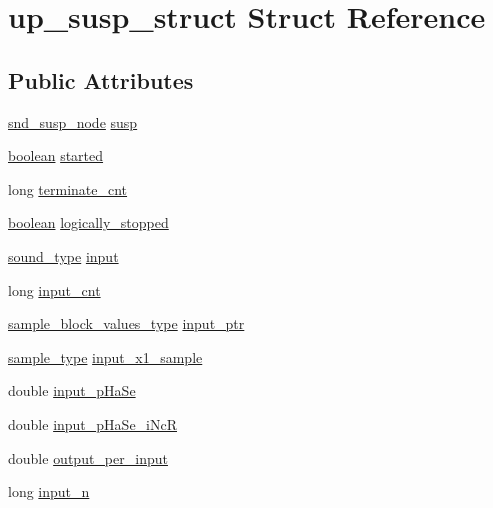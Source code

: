 \hypertarget{structup__susp__struct}{}\section{up\+\_\+susp\+\_\+struct Struct Reference}
\label{structup__susp__struct}
\subsection*{Public Attributes}
\begin{DoxyCompactItemize}
\item 
\hyperlink{sound_8h_a6b268203688a934bd798ceb55f85d4c0}{snd\+\_\+susp\+\_\+node} \hyperlink{structup__susp__struct_ad3cd762bd1dbff9321ae428baac7eebc}{susp}
\item 
\hyperlink{cext_8h_a7670a4e8a07d9ebb00411948b0bbf86d}{boolean} \hyperlink{structup__susp__struct_aa403483c9275f66ddf29206d5169a8fc}{started}
\item 
long \hyperlink{structup__susp__struct_a1613b3b8f26e114d7a03c2e1c7460c28}{terminate\+\_\+cnt}
\item 
\hyperlink{cext_8h_a7670a4e8a07d9ebb00411948b0bbf86d}{boolean} \hyperlink{structup__susp__struct_ae214d57a2638557d935796a1ec5b72be}{logically\+\_\+stopped}
\item 
\hyperlink{sound_8h_a792cec4ed9d6d636d342d9365ba265ea}{sound\+\_\+type} \hyperlink{structup__susp__struct_a4459a17fc4ed97fdca6bec3fb2cab370}{input}
\item 
long \hyperlink{structup__susp__struct_a419d1c129800f6692fed14746b8260b5}{input\+\_\+cnt}
\item 
\hyperlink{sound_8h_a83d17f7b465d1591f27cd28fc5eb8a03}{sample\+\_\+block\+\_\+values\+\_\+type} \hyperlink{structup__susp__struct_aba107cdef9e48f54b88fbf4d2b59b686}{input\+\_\+ptr}
\item 
\hyperlink{sound_8h_a3a9d1d4a1c153390d2401a6e9f71b32c}{sample\+\_\+type} \hyperlink{structup__susp__struct_a724b5c7a7f24c4c459f57fc533bb4bd4}{input\+\_\+x1\+\_\+sample}
\item 
double \hyperlink{structup__susp__struct_ac8e3b17dd0b21abf82deea33e4608df7}{input\+\_\+p\+Ha\+Se}
\item 
double \hyperlink{structup__susp__struct_a1ff0bf96af95e79536fe18284795895b}{input\+\_\+p\+Ha\+Se\+\_\+i\+NcR}
\item 
double \hyperlink{structup__susp__struct_a18fdb9d88254ffa47b13ebb46a03dfe4}{output\+\_\+per\+\_\+input}
\item 
long \hyperlink{structup__susp__struct_a193d2eb910a39cb1833fe79686d4f583}{input\+\_\+n}
\end{DoxyCompactItemize}


